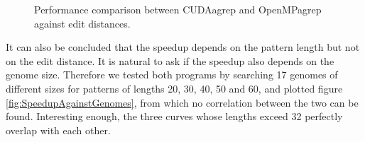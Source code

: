 \begin{figure}
\centering
{}
\caption{Performance comparison between CUDAagrep and OpenMPagrep against edit distances.}
\label{fig:PerformanceComparison}
\end{figure}

It can also be concluded that the speedup depends on the pattern length but not on the edit distance. It is natural to ask if the speedup also depends on the genome size. Therefore we tested both programs by searching 17 genomes of different sizes for patterns of lengths 20, 30, 40, 50 and 60, and plotted figure \ref{fig:SpeedupAgainstGenomes}, from which no correlation between the two can be found. Interesting enough, the three curves whose lengths exceed 32 perfectly overlap with each other.

